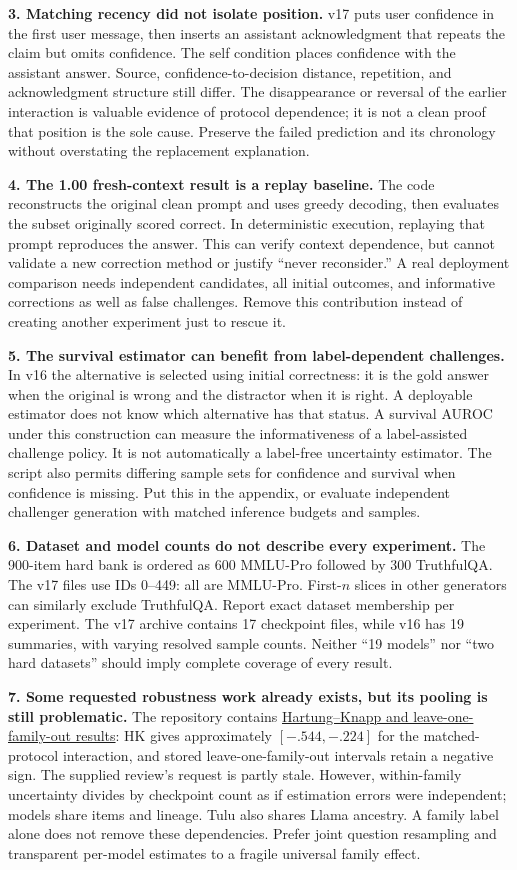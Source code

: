 \documentclass[11pt]{article}
\newcommand{\repo}[2]{\href{https://github.com/ANONYMIZED/reality-monitoring/blob/d2e42b3f64483a48ee2b87c371f03957a0ddcce2/#1}{#2}}
\begin{document}
\textbf{3. Matching recency did not isolate position.} v17 puts user confidence in the first user message, then inserts an assistant acknowledgment that repeats the claim but omits confidence. The self condition places confidence with the assistant answer. Source, confidence-to-decision distance, repetition, and acknowledgment structure still differ. The disappearance or reversal of the earlier interaction is valuable evidence of protocol dependence; it is not a clean proof that position is the sole cause. Preserve the failed prediction and its chronology without overstating the replacement explanation.

\textbf{4. The 1.00 fresh-context result is a replay baseline.} The code reconstructs the original clean prompt and uses greedy decoding, then evaluates the subset originally scored correct. In deterministic execution, replaying that prompt reproduces the answer. This can verify context dependence, but cannot validate a new correction method or justify ``never reconsider.'' A real deployment comparison needs independent candidates, all initial outcomes, and informative corrections as well as false challenges. Remove this contribution instead of creating another experiment just to rescue it.

\textbf{5. The survival estimator can benefit from label-dependent challenges.} In v16 the alternative is selected using initial correctness: it is the gold answer when the original is wrong and the distractor when it is right. A deployable estimator does not know which alternative has that status. A survival AUROC under this construction can measure the informativeness of a label-assisted challenge policy. It is not automatically a label-free uncertainty estimator. The script also permits differing sample sets for confidence and survival when confidence is missing. Put this in the appendix, or evaluate independent challenger generation with matched inference budgets and samples.

\textbf{6. Dataset and model counts do not describe every experiment.} The 900-item hard bank is ordered as 600 MMLU-Pro followed by 300 TruthfulQA. The v17 files use IDs 0--449: all are MMLU-Pro. First-$n$ slices in other generators can similarly exclude TruthfulQA. Report exact dataset membership per experiment. The v17 archive contains 17 checkpoint files, while v16 has 19 summaries, with varying resolved sample counts. Neither ``19 models'' nor ``two hard datasets'' should imply complete coverage of every result.

\textbf{7. Some requested robustness work already exists, but its pooling is still problematic.} The repository contains \repo{results/meta_robustness.json}{Hartung--Knapp and leave-one-family-out results}: HK gives approximately $[-.544,-.224]$ for the matched-protocol interaction, and stored leave-one-family-out intervals retain a negative sign. The supplied review's request is partly stale. However, within-family uncertainty divides by checkpoint count as if estimation errors were independent; models share items and lineage. Tulu also shares Llama ancestry. A family label alone does not remove these dependencies. Prefer joint question resampling and transparent per-model estimates to a fragile universal family effect.
\end{document}
